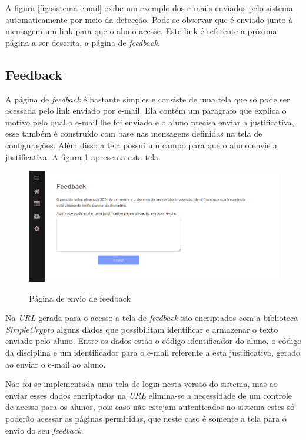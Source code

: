 A figura \ref{fig:sistema-email} exibe um exemplo dos e-mails enviados pelo sistema automaticamente por meio da detecção.
Pode-se observar que é enviado junto à mensagem um link para que o aluno acesse. Este link é referente a próxima página a ser descrita, a página de \textit{feedback}.

\subsection{Feedback}
\label{ssec:feedback}

A página de \textit{feedback} é bastante simples e consiste de uma tela que só pode ser acessada pelo link enviado por e-mail.
Ela contém um paragrafo que explica o motivo pelo qual o e-mail lhe foi enviado e o aluno precisa enviar a justificativa, esse também é construído com base nas mensagens definidas na tela de configurações.
Além disso a tela possui um campo para que o aluno envie a justificativa. 
A figura \ref{fig:sistema-feedback} apresenta esta tela.

\begin{figure}[!htb]
    \centering
    \caption{Página de envio de feedback}
    \includegraphics[width=1\textwidth]{./dados/figuras/sistema/sistema-feedback-1}
    \label{fig:sistema-feedback}
\end{figure}

Na \textit{URL} gerada para o acesso a tela de \textit{feedback} são encriptados com a biblioteca \textit{SimpleCrypto} alguns dados que possibilitam identificar e armazenar o texto enviado pelo aluno. 
Entre os dados estão o código identificador do aluno, o código da disciplina e um identificador para o e-mail referente a esta justificativa, gerado ao enviar o e-mail ao aluno.

Não foi-se implementada uma tela de login nesta versão do sistema, mas ao enviar esses dados encriptados na \textit{URL} elimina-se a necessidade de um controle de acesso para os alunos, pois caso não estejam autenticados no sistema estes só poderão acessar as páginas permitidas, que neste caso é somente a tela para o envio do seu \textit{feedback}.

